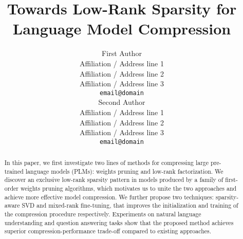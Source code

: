 \documentclass[11pt]{article}
\title{Towards Low-Rank Sparsity for Language Model Compression}
\author{First Author \\
  Affiliation / Address line 1 \\
  Affiliation / Address line 2 \\
  Affiliation / Address line 3 \\
  \texttt{email@domain} \\\And
  Second Author \\
  Affiliation / Address line 1 \\
  Affiliation / Address line 2 \\
  Affiliation / Address line 3 \\
  \texttt{email@domain} \\}
\begin{document}
\maketitle
\begin{abstract}
In this paper, we first investigate two lines of methods for compressing large pre-trained language
models (PLMs): weights pruning and low-rank factorization. We discover an exclusive low-rank sparsity pattern in models produced by a family of first-order weights pruning algorithms, which motivates us to unite the two approaches and
achieve more effective model compression. 
We further propose two techniques: sparsity-aware SVD and mixed-rank 
fine-tuning, that improves the initialization and training of the 
compression procedure respectively.  
Experiments on natural language understanding and question answering tasks 
show that the proposed method achieves superior compression-performance 
trade-off compared to existing approaches.
\end{abstract}

% 







 
 \clearpage
 
\end{document}
